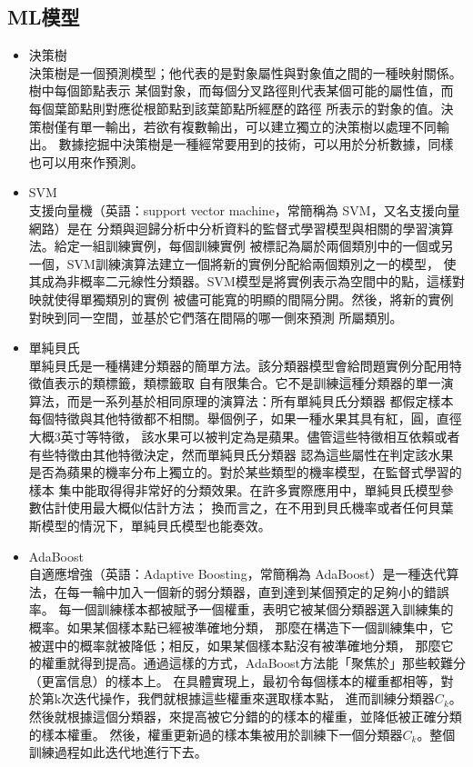 	\subsection{ML模型}
	\begin{itemize}
		\item 決策樹\\
			決策樹是一個預測模型；他代表的是對象屬性與對象值之間的一種映射關係。樹中每個節點表示
			某個對象，而每個分叉路徑則代表某個可能的屬性值，而每個葉節點則對應從根節點到該葉節點所經歷的路徑
			所表示的對象的值。決策樹僅有單一輸出，若欲有複數輸出，可以建立獨立的決策樹以處理不同輸出。
			數據挖掘中決策樹是一種經常要用到的技術，可以用於分析數據，同樣也可以用來作預測。 
		\item SVM\\
			支援向量機（英語：support vector machine，常簡稱為 SVM，又名支援向量網路）是在
			分類與迴歸分析中分析資料的監督式學習模型與相關的學習演算法。給定一組訓練實例，每個訓練實例
			被標記為屬於兩個類別中的一個或另一個，SVM訓練演算法建立一個將新的實例分配給兩個類別之一的模型，
			使其成為非概率二元線性分類器。SVM模型是將實例表示為空間中的點，這樣對映就使得單獨類別的實例
			被儘可能寬的明顯的間隔分開。然後，將新的實例對映到同一空間，並基於它們落在間隔的哪一側來預測
			所屬類別。
		\item 單純貝氏\\
			單純貝氏是一種構建分類器的簡單方法。該分類器模型會給問題實例分配用特徵值表示的類標籤，類標籤取
			自有限集合。它不是訓練這種分類器的單一演算法，而是一系列基於相同原理的演算法：所有單純貝氏分類器
			都假定樣本每個特徵與其他特徵都不相關。舉個例子，如果一種水果其具有紅，圓，直徑大概3英寸等特徵，
			該水果可以被判定為是蘋果。儘管這些特徵相互依賴或者有些特徵由其他特徵決定，然而單純貝氏分類器
			認為這些屬性在判定該水果是否為蘋果的機率分布上獨立的。對於某些類型的機率模型，在監督式學習的樣本
			集中能取得得非常好的分類效果。在許多實際應用中，單純貝氏模型參數估計使用最大概似估計方法；
			換而言之，在不用到貝氏機率或者任何貝葉斯模型的情況下，單純貝氏模型也能奏效。
		\item AdaBoost\\
			自適應增強（英語：Adaptive Boosting，常簡稱為 AdaBoost）是一種迭代算法，在每一輪中加入一個新的弱分類器，直到達到某個預定的足夠小的錯誤率。
			每一個訓練樣本都被賦予一個權重，表明它被某個分類器選入訓練集的概率。如果某個樣本點已經被準確地分類，
			那麼在構造下一個訓練集中，它被選中的概率就被降低；相反，如果某個樣本點沒有被準確地分類，
			那麼它的權重就得到提高。通過這樣的方式，AdaBoost方法能「聚焦於」那些較難分（更富信息）的樣本上。
			在具體實現上，最初令每個樣本的權重都相等，對於第k次迭代操作，我們就根據這些權重來選取樣本點，
			進而訓練分類器$C_k$。然後就根據這個分類器，來提高被它分錯的的樣本的權重，並降低被正確分類的樣本權重。
			然後，權重更新過的樣本集被用於訓練下一個分類器$C_k$。整個訓練過程如此迭代地進行下去。
	\end{itemize}